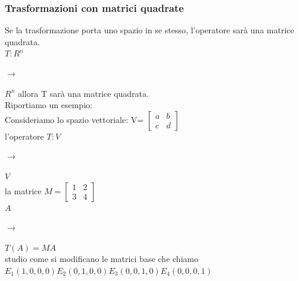 \documentclass[a4paper]{article}
\begin{document}
\subsubsection{Trasformazioni con matrici quadrate}
Se la trasformazione porta uno spazio in se stesso, l'operatore sarà una matrice quadrata.
\\ $T:R^n$
\begin{large} $\rightarrow$ \end{large} 
$R^n$
allora T sarà una matrice quadrata.
\\Riportiamo un esempio:
\\Consideriamo lo spazio vettoriale: V= $\left[\begin{matrix}a& b\\ c & d\end{matrix}\right]
$
\\ l'operatore $T: V$ \begin{large} $\rightarrow$ \end{large} $V$
\\ la matrice $M= \left[\begin{matrix}1& 2 \\ 3 & 4\end{matrix}\right]
$
\\ $A$\begin{large} $\rightarrow$ \end{large} $T(A) = MA$
\\ studio come si modificano le matrici base che chiamo $E_{1} (1,0,0,0) E_{2} (0,1,0,0) E_{3} (0,0,1,0) E_{4} (0,0,0,1)$
\\
\end{document}
